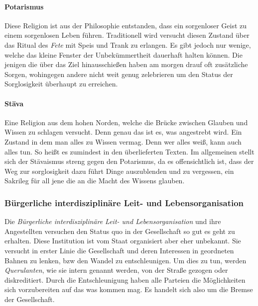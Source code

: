             \paragraph{Potarismus}
                \label{par:potarismus}
                Diese Religion ist aus der Philosophie entstanden, dass ein sorgenloser Geist zu einem sorgenlosen Leben führen. Traditionell wird versucht diesen Zustand über das Ritual des \emph{Fete} mit Speis und Trank zu erlangen. Es gibt jedoch nur wenige, welche das kleine Fenster der Unbekümmertheit dauerhaft halten können. Die jenigen die über das Ziel hinausschießen haben am morgen drauf oft zusätzliche Sorgen, wohingegen andere nicht weit genug zelebrieren um den Status der Sorglosigkeit überhaupt zu erreichen.

            \paragraph{Stäva}
                \label{par:stava}
                Eine Religion aus dem hohen Norden, welche die Brücke zwischen Glauben und Wissen zu schlagen versucht. Denn genau das ist es, was angestrebt wird. Ein Zustand in dem man alles zu Wissen vermag. Denn wer alles weiß, kann auch alles tun. So heißt es zumindest in den überlieferten Texten. Im allgemeinen stellt sich der Stävaismus streng gegen den Potarismus, da es offensichtlich ist, dass der Weg zur sorglosigkeit dazu führt Dinge auszublenden und zu vergessen, ein Sakrileg für all jene die an die Macht des Wissens glauben.



        \subsubsection{Bürgerliche interdisziplinäre Leit- und Lebensorganisation}
            \label{subsubsec:billo}
            Die \emph{Bürgerliche interdisziplinäre Leit- und Lebensorganisation} und ihre Angestellten versuchen den Status quo in der Gesellschaft so gut es geht zu erhalten. Diese Institution ist vom Staat organisiert aber eher unbekannt. Sie versucht in erster Linie die Gesellschaft und deren Interessen in geordneten Bahnen zu lenken, bzw den Wandel zu entschleunigen. Um dies zu tun, werden \emph{Querulanten}, wie sie intern genannt werden, von der Straße gezogen oder diskreditiert. Durch die Entschleunigung haben alle Parteien die Möglichkeiten sich vorzubereiten auf das was kommen mag. Es handelt sich also um die Bremse der Gesellschaft.
